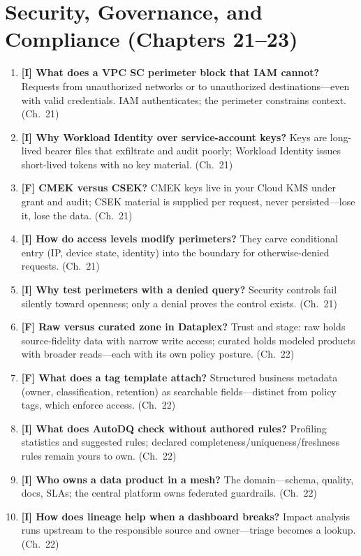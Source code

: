 \section{Security, Governance, and Compliance (Chapters 21--23)}
\begin{enumerate}
    \item \textbf{[I] What does a VPC SC perimeter block that IAM cannot?} Requests from
    unauthorized networks or to unauthorized destinations---even with valid credentials. IAM
    authenticates; the perimeter constrains context. (Ch.~21)
    \item \textbf{[I] Why Workload Identity over service-account keys?} Keys are long-lived bearer
    files that exfiltrate and audit poorly; Workload Identity issues short-lived tokens with no key
    material. (Ch.~21)
    \item \textbf{[F] CMEK versus CSEK?} CMEK keys live in your Cloud KMS under grant and audit;
    CSEK material is supplied per request, never persisted---lose it, lose the data. (Ch.~21)
    \item \textbf{[I] How do access levels modify perimeters?} They carve conditional entry (IP,
    device state, identity) into the boundary for otherwise-denied requests. (Ch.~21)
    \item \textbf{[I] Why test perimeters with a denied query?} Security controls fail silently
    toward openness; only a denial proves the control exists. (Ch.~21)
    \item \textbf{[F] Raw versus curated zone in Dataplex?} Trust and stage: raw holds
    source-fidelity data with narrow write access; curated holds modeled products with broader
    reads---each with its own policy posture. (Ch.~22)
    \item \textbf{[F] What does a tag template attach?} Structured business metadata (owner,
    classification, retention) as searchable fields---distinct from policy tags, which enforce
    access. (Ch.~22)
    \item \textbf{[I] What does AutoDQ check without authored rules?} Profiling statistics and
    suggested rules; declared completeness/uniqueness/freshness rules remain yours to own. (Ch.~22)
    \item \textbf{[I] Who owns a data product in a mesh?} The domain---schema, quality, docs,
    SLAs; the central platform owns federated guardrails. (Ch.~22)
    \item \textbf{[I] How does lineage help when a dashboard breaks?} Impact analysis runs
    upstream to the responsible source and owner---triage becomes a lookup. (Ch.~22)

\end{enumerate}
